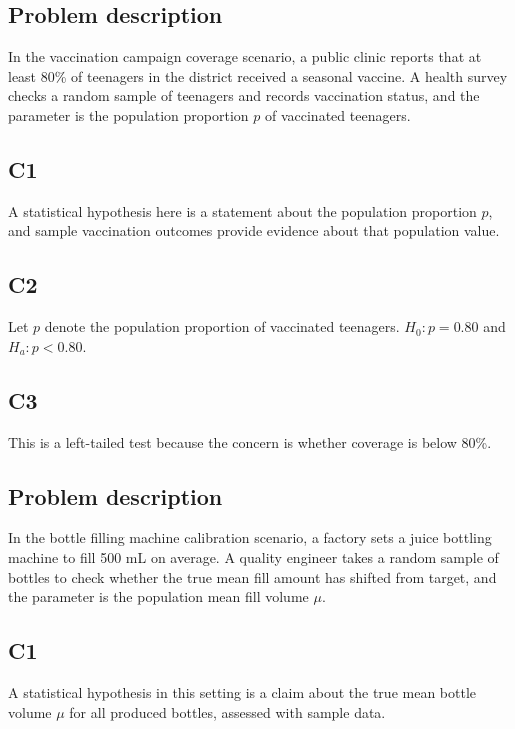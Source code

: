 \begin{ExamProblems}
		\item
		\subsection*{Problem description}
		In the vaccination campaign coverage scenario, a public clinic reports that at least 80\% of teenagers in the district received a seasonal vaccine. A health survey checks a random sample of teenagers and records vaccination status, and the parameter is the population proportion \(p\) of vaccinated teenagers.

		\subsection*{C1}
		A statistical hypothesis here is a statement about the population proportion \(p\), and sample vaccination outcomes provide evidence about that population value.

		\subsection*{C2}
		Let \(p\) denote the population proportion of vaccinated teenagers. \(H_0\colon p = 0.80\) and \(H_a\colon p < 0.80\).

		\subsection*{C3}
		This is a left-tailed test because the concern is whether coverage is below 80\%.

		\item
		\subsection*{Problem description}
		In the bottle filling machine calibration scenario, a factory sets a juice bottling machine to fill 500 mL on average. A quality engineer takes a random sample of bottles to check whether the true mean fill amount has shifted from target, and the parameter is the population mean fill volume \(\mu\).

		\subsection*{C1}
		A statistical hypothesis in this setting is a claim about the true mean bottle volume \(\mu\) for all produced bottles, assessed with sample data.


\end{ExamProblems}
